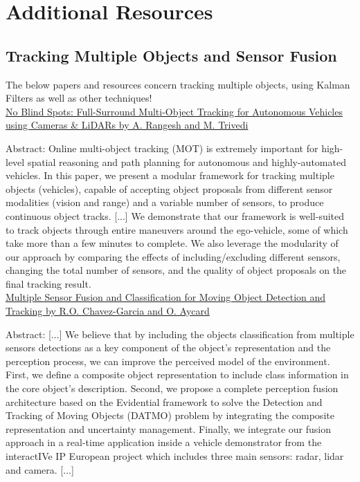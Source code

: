 \documentclass[11pt, a4paper]{article}
\begin{document}
\section{Additional Resources}%
\label{sec:additional_resources}

\subsection{Tracking Multiple Objects and Sensor Fusion}%
\label{sub:tracking_multiple_objects_and_sensor_fusion}


The below papers and resources concern tracking multiple objects, using Kalman Filters as well as other techniques!  \\

\href{https://arxiv.org/pdf/1802.08755.pdf}{No Blind Spots: Full-Surround Multi-Object Tracking for Autonomous Vehicles using Cameras \& LiDARs by A. Rangesh and M. Trivedi}

Abstract: Online multi-object tracking (MOT) is extremely important for high-level spatial reasoning and path planning for autonomous and highly-automated vehicles. In this paper, we present a modular framework for tracking multiple objects (vehicles), capable of accepting object proposals from different sensor modalities (vision and range) and a variable number of sensors, to produce continuous object tracks. [...] We demonstrate that our framework is well-suited to track objects through entire maneuvers around the ego-vehicle, some of which take more than a few minutes to complete. We also leverage the modularity of our approach by comparing the effects of including/excluding different sensors, changing the total number of sensors, and the quality of object proposals on the final tracking result. \\



\href{https://hal.archives-ouvertes.fr/hal-01241846/document}{Multiple Sensor Fusion and Classification for Moving Object Detection and Tracking by R.O. Chavez-Garcia and O. Aycard}

Abstract: [...] We believe that by including the objects classification from multiple sensors detections as a key component of the object’s representation and the perception process, we can improve the perceived model of the environment. First, we define a composite object representation to include class information in the core object’s description. Second, we propose a complete perception fusion architecture based on the Evidential framework to solve the Detection and Tracking of Moving Objects (DATMO) problem by integrating the composite representation and uncertainty management. Finally, we integrate our fusion approach in a real-time application inside a vehicle demonstrator from the interactIVe IP European project which includes three main sensors: radar, lidar and camera. [...] \\
\end{document}
